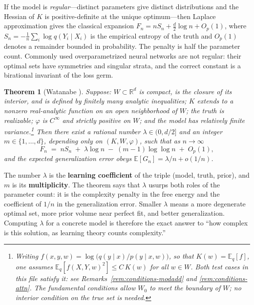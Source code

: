 \documentclass[11pt]{amsart}
\theoremstyle{plain}
\newtheorem{theorem}{Theorem}[section]
\theoremstyle{definition}
\newcommand{\R}{\mathbb{R}}
\newcommand{\E}{\mathbb{E}}
\begin{document}
If the model is \emph{regular}---distinct parameters give distinct distributions and the Hessian of $K$ is positive-definite at the unique optimum---then Laplace approximation gives the classical expansion $F_n = nS_n + \frac d2 \log n + O_p(1)$, where $S_n = -\frac1n\sum_i \log q(Y_i \mid X_i)$ is the empirical entropy of the truth and $O_p(1)$ denotes a remainder bounded in probability. The penalty is half the parameter count. Commonly used overparametrized neural networks are not regular: their optimal sets have symmetries and singular strata, and the correct constant is a birational invariant of the loss germ.

\begin{theorem}[Watanabe \cite{watanabe2009}]\label{thm:watanabe}
Suppose\textup{:} $W \subset \R^d$ is compact, is the closure of its interior, and is defined by finitely many analytic inequalities\textup{;} $K$ extends to a nonzero real-analytic function on an open neighborhood of $W$\textup{;} the truth is realizable\textup{;} $\varphi$ is $C^\infty$ and strictly positive on $W$\textup{;} and the model has relatively finite variance.\footnote{Writing $f(x,y,w) = \log\bigl(q(y\mid x)/p(y \mid x,w)\bigr)$, so that $K(w) = \E_q[f]$, one assumes $\E_q[f(X,Y,w)^2] \le C\,K(w)$ for all $w \in W$. Both test cases in this file satisfy it: see Remarks~\ref{rem:conditions-modadd} and \ref{rem:conditions-attn}. The fundamental conditions allow $W_0$ to meet the boundary of $W$; no interior condition on the true set is needed.} Then there exist a rational number $\lambda \in (0, d/2]$ and an integer $m \in \{1,\dots,d\}$, depending only on $(K, W, \varphi)$, such that as $n \to \infty$
\begin{equation}\label{eq:free-energy}
   F_n \;=\; n S_n \;+\; \lambda \log n \;-\; (m-1)\log\log n \;+\; O_p(1),
\end{equation}
and the expected generalization error obeys $\E[G_n] = \lambda/n + o(1/n)$.
\end{theorem}

The number $\lambda$ is the \textbf{learning coefficient} of the triple (model, truth, prior), and $m$ is its \textbf{multiplicity}. The theorem says that $\lambda$ usurps both roles of the parameter count: it is the complexity penalty in the free energy and the coefficient of $1/n$ in the generalization error. Smaller $\lambda$ means a more degenerate optimal set, more prior volume near perfect fit, and better generalization. Computing $\lambda$ for a concrete model is therefore the exact answer to ``how complex is this solution, as learning theory counts complexity.''
\end{document}
